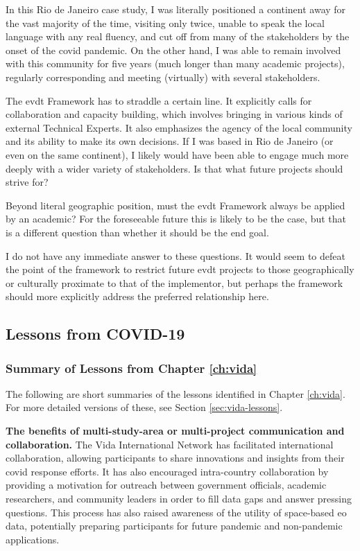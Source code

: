 In this Rio de Janeiro case study, I was literally positioned a continent away for the vast majority of the time, visiting only twice, unable to speak the local language with any real fluency, and cut off from many of the stakeholders by the onset of the \ac{covid} pandemic. On the other hand, I was able to remain involved with this community for five years (much longer than many academic projects), regularly corresponding and meeting (virtually) with several stakeholders. 

The \ac{evdt} Framework has to straddle a certain line. It explicitly calls for collaboration and capacity building, which involves bringing in various kinds of external Technical Experts. It also emphasizes the agency of the local community and its ability to make its own decisions. If I was based in Rio de Janeiro (or even on the same continent), I likely would have been able to engage much more deeply with a wider variety of stakeholders. Is that what future projects should strive for?

Beyond literal geographic position, must the \ac{evdt} Framework always be applied by an academic? For the foreseeable future this is likely to be the case, but that is a different question than whether it should be the end goal.

I do not have any immediate answer to these questions. It would seem to defeat the point of the framework to restrict future \ac{evdt} projects to those geographically or culturally proximate to that of the implementor, but perhaps the framework should more explicitly address the preferred relationship here. 


\subsection{Lessons from COVID-19}

\subsubsection{Summary of Lessons from Chapter \ref{ch:vida}} 

The following are short summaries of the lessons identified in Chapter \ref{ch:vida}. For more detailed versions of these, see Section \ref{sec:vida-lessons}.

\textbf{The benefits of multi-study-area or multi-project communication and collaboration.} The Vida International Network has facilitated international collaboration, allowing participants to share innovations and insights from their \ac{covid} response efforts. It has also encouraged intra-country collaboration by providing a motivation for outreach between government officials, academic researchers, and community leaders in order to fill data gaps and answer pressing questions. This process has also raised awareness of the utility of space-based \ac{eo} data, potentially preparing participants for future pandemic and non-pandemic applications. 

